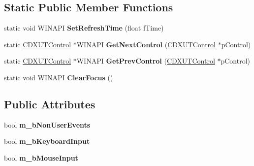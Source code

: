 \subsection*{Static Public Member Functions}
\begin{DoxyCompactItemize}
\item 
\hypertarget{class_c_d_x_u_t_dialog_ae51fdc01f5187884271ffe4beb91d123}{static void W\+I\+N\+A\+P\+I {\bfseries Set\+Refresh\+Time} (float f\+Time)}\label{class_c_d_x_u_t_dialog_ae51fdc01f5187884271ffe4beb91d123}

\item 
\hypertarget{class_c_d_x_u_t_dialog_a296f861718f43a5a5ec0d112094f5cc0}{static \hyperlink{class_c_d_x_u_t_control}{C\+D\+X\+U\+T\+Control} $\ast$W\+I\+N\+A\+P\+I {\bfseries Get\+Next\+Control} (\hyperlink{class_c_d_x_u_t_control}{C\+D\+X\+U\+T\+Control} $\ast$p\+Control)}\label{class_c_d_x_u_t_dialog_a296f861718f43a5a5ec0d112094f5cc0}

\item 
\hypertarget{class_c_d_x_u_t_dialog_ac0999d1694204b66f86a85f117e2a2da}{static \hyperlink{class_c_d_x_u_t_control}{C\+D\+X\+U\+T\+Control} $\ast$W\+I\+N\+A\+P\+I {\bfseries Get\+Prev\+Control} (\hyperlink{class_c_d_x_u_t_control}{C\+D\+X\+U\+T\+Control} $\ast$p\+Control)}\label{class_c_d_x_u_t_dialog_ac0999d1694204b66f86a85f117e2a2da}

\item 
\hypertarget{class_c_d_x_u_t_dialog_ac08c4dea0b23129bb11eae8055d9da27}{static void W\+I\+N\+A\+P\+I {\bfseries Clear\+Focus} ()}\label{class_c_d_x_u_t_dialog_ac08c4dea0b23129bb11eae8055d9da27}

\end{DoxyCompactItemize}
\subsection*{Public Attributes}
\begin{DoxyCompactItemize}
\item 
\hypertarget{class_c_d_x_u_t_dialog_a282063050d5cbad2b070ccafe9edb1d4}{bool {\bfseries m\+\_\+b\+Non\+User\+Events}}\label{class_c_d_x_u_t_dialog_a282063050d5cbad2b070ccafe9edb1d4}

\item 
\hypertarget{class_c_d_x_u_t_dialog_ab298c311bb2389a8928c0650f8da4df8}{bool {\bfseries m\+\_\+b\+Keyboard\+Input}}\label{class_c_d_x_u_t_dialog_ab298c311bb2389a8928c0650f8da4df8}

\item 
\hypertarget{class_c_d_x_u_t_dialog_a4e6779884aa890d660bf43072ff15b2f}{bool {\bfseries m\+\_\+b\+Mouse\+Input}}\label{class_c_d_x_u_t_dialog_a4e6779884aa890d660bf43072ff15b2f}

\end{DoxyCompactItemize}
